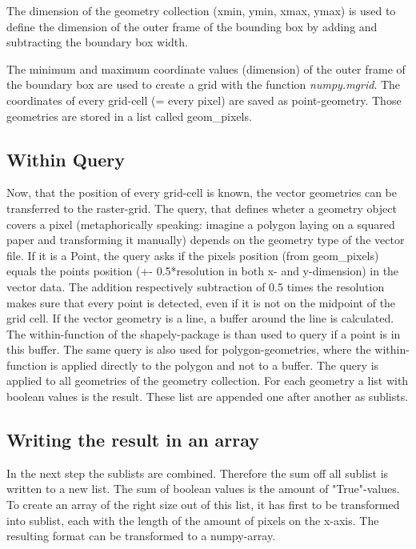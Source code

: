 \documentclass[10pt, a4paper]{article}
\begin{document}
	The dimension of the geometry collection (xmin, ymin, xmax, ymax) is used to define the dimension of the outer frame of the bounding box by adding and subtracting the boundary box width.
	
	The minimum and maximum coordinate values (dimension) of the outer frame of the boundary box are used to create a grid with the function \textit{numpy.mgrid}. The coordinates of every grid-cell (= every pixel) are saved as point-geometry. Those geometries are stored in a list called geom\_pixels.
	
	\subsection*{Within Query}\label{within}
	Now, that the position of every grid-cell is known, the vector geometries can be transferred to the raster-grid. The query, that defines wheter a geometry object covers a pixel (metaphorically speaking: imagine a polygon laying on a squared paper and transforming it manually) depends on the geometry type of the vector file. 
	If it is a Point, the query asks if the pixels position (from geom\_pixels) equals the points position (+- 0.5*resolution in both x- and y-dimension) in the vector data. The addition respectively subtraction of 0.5 times the resolution makes sure that every point is detected, even if it is not on the midpoint of the grid cell. 
	If the vector geometry is a line, a buffer around the line is calculated. The within-function of the shapely-package is than used to query if a point is in this buffer. The same query is also used for polygon-geometries, where the within-function is applied directly to the polygon and not to a buffer.
	The query is applied to all geometries of the geometry collection. For each geometry a list with boolean values is the result. These list are appended one after another as sublists.
	
	\subsection*{Writing the result in an array}
	In the next step the sublists are combined. Therefore the sum off all sublist is written to a new list. The sum of boolean values is the amount of "True"-values.  To create an array of the right size out of this list, it has first to be transformed into sublist, each with the length of the amount of pixels on the x-axis. The resulting format can be transformed to a numpy-array.
	
\end{document}
